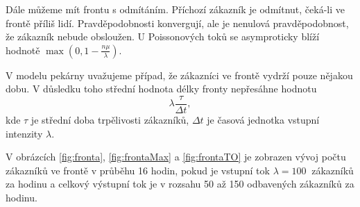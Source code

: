 \documentclass[a4paper,12pt]{article}
\begin{document}
Dále můžeme mít frontu s odmítáním. Příchozí zákazník je odmítnut, čeká-li ve frontě příliš lidí. 
Pravděpodobnosti konvergují, ale je nenulová pravděpodobnost, že zákazník nebude obsloužen. 
U Poissonových toků se asymproticky blíží hodnotě \(\max(0,1-\frac{n\mu}{\lambda})\). 

V modelu pekárny uvažujeme případ, že zákazníci ve frontě vydrží pouze nějakou dobu. V důsledku toho 
střední hodnota délky fronty nepřesáhne hodnotu 
\[\lambda \frac{\tau}{\Delta t}, \]
kde \(\tau\) je střední doba trpělivosti zákazníků, \(\Delta t\) je časová jednotka vstupní intenzity \(\lambda\). 

V obrázcích \ref{fig:fronta}, \ref{fig:frontaMax} a \ref{fig:frontaTO} je zobrazen vývoj počtu zákazníků ve frontě
v průběhu 16 hodin, pokud je vstupní tok \(\lambda = 100~\) zákazníků za hodinu a celkový výstupní tok je v rozsahu 50 až 150 
odbavených zákazníků za hodinu. 
\end{document}
